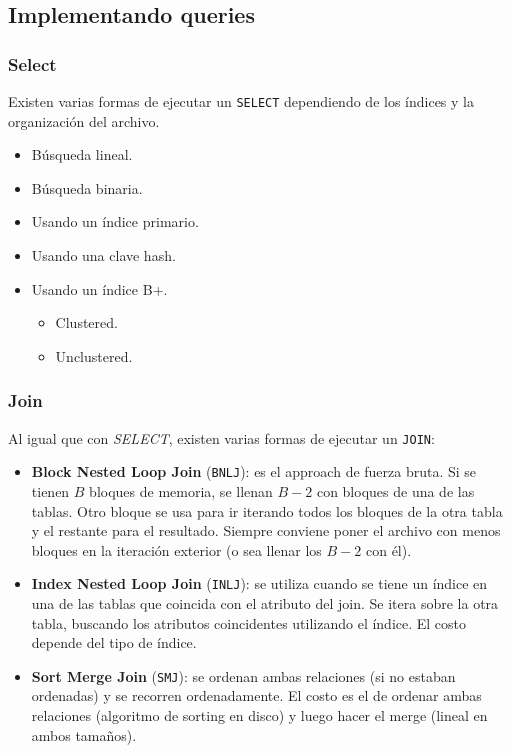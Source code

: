 \documentclass[]{article}
\begin{document}

\subsection{Implementando queries}
\subsubsection{Select}
Existen varias formas de ejecutar un \texttt{SELECT} dependiendo de los índices y la organización del archivo.
\begin{itemize}
    \item Búsqueda lineal.
    \item Búsqueda binaria.
    \item Usando un índice primario.
    \item Usando una clave hash.
    \item Usando un índice B+.
    \begin{itemize}
        \item Clustered.
        \item Unclustered.
    \end{itemize}
\end{itemize}


\subsubsection{Join}
Al igual que con \emph{SELECT}, existen varias formas de ejecutar un \texttt{JOIN}:
\begin{itemize}
    \item \textbf{Block Nested Loop Join} (\texttt{BNLJ}): es el approach de fuerza bruta. Si se tienen $B$ bloques de memoria, se llenan $B-2$ con bloques de una de las tablas. Otro bloque se usa para ir iterando todos los bloques de la otra tabla y el restante para el resultado. Siempre conviene poner el archivo con menos bloques en la iteración exterior (o sea llenar los $B-2$ con él). %
    \item \textbf{Index Nested Loop Join} (\texttt{INLJ}): se utiliza cuando se tiene un índice en una de las tablas que coincida con el atributo del join. Se itera sobre la otra tabla, buscando los atributos coincidentes utilizando el índice. El costo depende del tipo de índice.
    \item \textbf{Sort Merge Join} (\texttt{SMJ}): se ordenan ambas relaciones (si no estaban ordenadas) y se recorren ordenadamente. El costo es el de ordenar ambas relaciones (algoritmo de sorting en disco) y luego hacer el merge (lineal en ambos tamaños).
\end{itemize}
\end{document}
